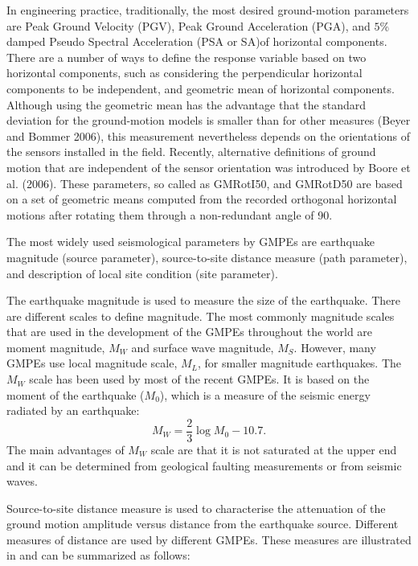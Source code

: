 In engineering practice, traditionally, the most desired
ground-motion parameters are Peak Ground Velocity (PGV), Peak Ground
Acceleration (PGA), and $5\%$ damped Pseudo Spectral Acceleration
(PSA or SA)of horizontal components. There are a number of ways to
define the response variable based on two horizontal components,
such as considering the perpendicular horizontal components to be
independent, and geometric mean of horizontal components. Although
using the geometric mean has the advantage that the standard
deviation for the ground-motion models is smaller than for other
measures (Beyer and Bommer 2006), this measurement nevertheless
depends on the orientations of the sensors installed in the field.
Recently, alternative definitions of ground motion that are
independent of the sensor orientation was introduced by Boore et al.
(2006). These parameters, so called as GMRotI50, and GMRotD50 are
based on a set of geometric means computed from the recorded
orthogonal horizontal motions after rotating them through a
non-redundant angle of 90.

The most widely used seismological parameters by GMPEs are
earthquake magnitude (source parameter), source-to-site distance
measure (path parameter), and description of local site condition
(site parameter).

The earthquake magnitude is used to measure the size of the
earthquake. There are different scales to define magnitude. The most
commonly magnitude scales that are used in the development of the
GMPEs throughout the world are moment magnitude, $M_W$ and surface
wave magnitude, $M_S$. However, many GMPEs use local magnitude
scale, $M_L$, for smaller magnitude earthquakes. The $M_W$ scale has
been used by most of the recent GMPEs. It is based on the moment of
the earthquake ($M_0$), which is a measure of the seismic energy
radiated by an earthquake:
\begin{equation}\label{eq:MW}
M_W=\frac{2}{3}\log {M_0}-10.7.
\end{equation}
The main advantages of $M_W$ scale are that it is not saturated at
the upper end and it can be determined from geological faulting
measurements or from seismic waves.

Source-to-site distance measure is used to characterise the
attenuation of the ground motion amplitude versus distance from the
earthquake source. Different measures of distance are used by
different GMPEs. These measures are illustrated in
 and can be summarized as follows:

